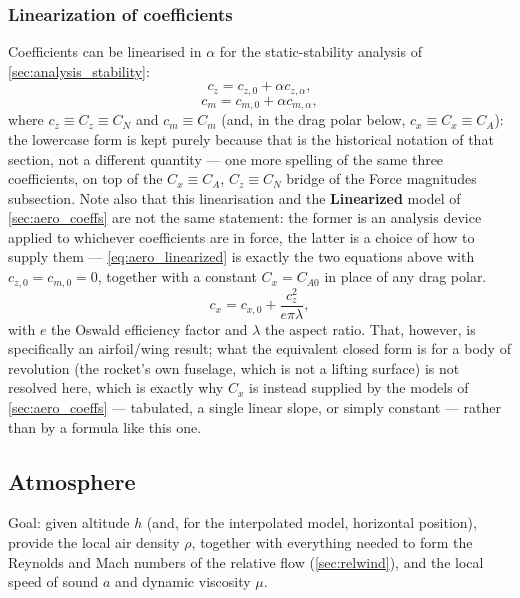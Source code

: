 \subsubsection{Linearization of coefficients}\label{sec:aero_linearization}
Coefficients can be linearised in $\alpha$ for the static-stability analysis of
\autoref{sec:analysis_stability}:
\begin{equation}
    c_z = c_{z,0} + \alpha c_{z,\alpha},
\end{equation}
\begin{equation}
    c_m = c_{m,0} + \alpha c_{m,\alpha},
\end{equation}
where $c_z\equiv C_z\equiv C_N$ and $c_m\equiv C_m$ (and, in the drag polar below,
$c_x\equiv C_x\equiv C_A$): the lowercase form is kept purely because that is the historical
notation of that section, not a different quantity --- one more spelling of the same three
coefficients, on top of the $C_x\equiv C_A$, $C_z\equiv C_N$ bridge of the Force magnitudes
subsection. Note also that this linearisation and the \textbf{Linearized} model of
\autoref{sec:aero_coeffs} are not the same statement: the former is an analysis device applied to
whichever coefficients are in force, the latter is a choice of how to supply them ---
\autoref{eq:aero_linearized} is exactly the two equations above with $c_{z,0}=c_{m,0}=0$, together
with a constant $C_x=C_{A0}$ in place of any drag polar.
\begin{equation}
    c_x = c_{x,0} + \frac{c_z^2}{e\pi\lambda},
\end{equation}
with $e$ the Oswald efficiency factor and $\lambda$ the aspect ratio. That, however, is
specifically an airfoil/wing result; what the equivalent closed form is for a body of revolution
(the rocket's own fuselage, which is not a lifting surface) is not resolved here, which is exactly
why $C_x$ is instead supplied by the models of \autoref{sec:aero_coeffs} --- tabulated, a single
linear slope, or simply constant --- rather than by a formula like this one.

\subsection{Atmosphere}\label{sec:atmosphere}
Goal: given altitude $h$ (and, for the interpolated model, horizontal position), provide the local
air density $\rho$, together with everything needed to form the Reynolds and Mach numbers of the
relative flow (\autoref{sec:relwind}), and the local speed of sound $a$ and dynamic viscosity
$\mu$.

